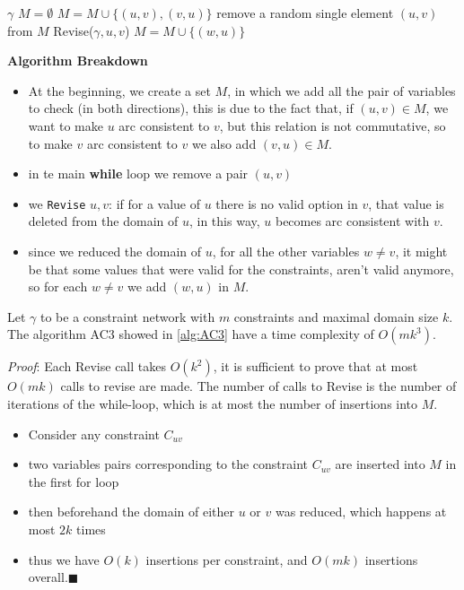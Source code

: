 \documentclass[10pt, letterpaper]{report}
\begin{document}
\begin{algorithm}
    \caption{AC\_3}\label{alg:AC3}
    \begin{algorithmic}
    \Require $\gamma$
    \State $M=\emptyset$
     \State $M=M\cup\{(u,v),(v,u)\}$
     \EndFor
      \State remove a random single element $(u,v)$ from $M$
      \State Revise($\gamma,u,v$)
      \State $M=M\cup\{(w,u)\}$
       \EndFor
      \EndIf 
      \EndWhile
    \end{algorithmic}
\end{algorithm}
\noindent\textbf{Algorithm Breakdown}\begin{itemize}
    \item At the beginning, we create a set $M$, in which we add all the pair of variables to check (in both directions), this is due to the fact that, if $(u,v)\in M$, we want to make $u$ arc consistent to $v$, but this relation is not commutative, so to make $v$ arc consistent to $v$ we also add $(v,u)\in M$.
    \item in te main \textbf{while} loop we remove a pair $(u,v)$ 
    \item we \texttt{Revise} $u,v$: if for a value of $u$ there is no valid option in $v$, that value is deleted from the domain of $u$, in this way, $u$ becomes arc consistent with $v$.
    \item since we reduced the domain of $u$, for all the other variables $w\ne v$, it might be that some values that were valid for the constraints, aren't valid anymore, so for each $w\ne v$ we add $(w,u)$ in $M$.
\end{itemize}
\begin{theorem}
    Let $\gamma$ to be a constraint network with $m$ constraints and maximal domain size $k$. The algorithm AC3 showed in \ref{alg:AC3} have a time complexity of $O(mk^3)$.
\end{theorem}
\textit{Proof}: Each Revise call takes $O(k^2)$, it is sufficient to prove that at most $O(mk)$ calls to revise are made. 
The number of calls to Revise is the number of iterations of the
while-loop, which is at most the number of insertions into $M$. \begin{itemize}
    \item Consider
    any constraint $C_{uv}$
    \item two variables pairs corresponding to the constraint $C_{uv}$ are inserted into $M$ in the first for loop
    \item then
beforehand the domain of either $u $ or $v$ was reduced, which happens at
most $2k$ times 
\item thus we have $O(k)$ insertions per constraint, and $O(mk)$ insertions overall.\hfill$\blacksquare$
\end{itemize}
\end{document}
